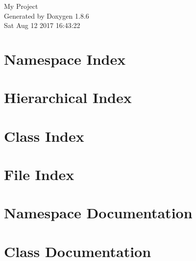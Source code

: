 \documentclass[twoside]{book}
\newcommand{\clearemptydoublepage}{%
  \newpage{\pagestyle{empty}\cleardoublepage}%
}
\begin{document}
\hypersetup{pageanchor=false}
\begin{titlepage}
\vspace*{7cm}
\begin{center}%
{\Large My Project }\\
\vspace*{1cm}
{\large Generated by Doxygen 1.8.6}\\
\vspace*{0.5cm}
{\small Sat Aug 12 2017 16:43:22}\\
\end{center}
\end{titlepage}
\clearemptydoublepage
\tableofcontents
\clearemptydoublepage
{}
\hypersetup{pageanchor=true}

\chapter{Namespace Index}

\chapter{Hierarchical Index}

\chapter{Class Index}

\chapter{File Index}

\chapter{Namespace Documentation}


\chapter{Class Documentation}















\end{document}
